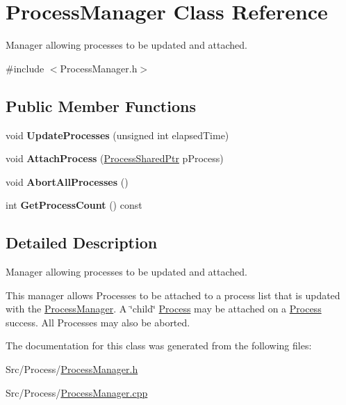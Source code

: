 \hypertarget{classProcessManager}{\section{Process\-Manager Class Reference}
\label{classProcessManager}
}


Manager allowing processes to be updated and attached.  




{\ttfamily \#include $<$Process\-Manager.\-h$>$}

\subsection*{Public Member Functions}
\begin{DoxyCompactItemize}
\item 
\hypertarget{classProcessManager_a962a29955eb8aeef8c3303101126072c}{void {\bfseries Update\-Processes} (unsigned int elapsed\-Time)}\label{classProcessManager_a962a29955eb8aeef8c3303101126072c}

\item 
\hypertarget{classProcessManager_a2c1fc51c9388380c5adfbf222e75fd26}{void {\bfseries Attach\-Process} (\hyperlink{Process_8h_af04951552f62d8a3c69cca91c23500cc}{Process\-Shared\-Ptr} p\-Process)}\label{classProcessManager_a2c1fc51c9388380c5adfbf222e75fd26}

\item 
\hypertarget{classProcessManager_a09099f1d8e10f043baa251cf4a7d3f75}{void {\bfseries Abort\-All\-Processes} ()}\label{classProcessManager_a09099f1d8e10f043baa251cf4a7d3f75}

\item 
\hypertarget{classProcessManager_a04b80a05a8276cc9ee6dad2067c74a11}{int {\bfseries Get\-Process\-Count} () const }\label{classProcessManager_a04b80a05a8276cc9ee6dad2067c74a11}

\end{DoxyCompactItemize}


\subsection{Detailed Description}
Manager allowing processes to be updated and attached. 

This manager allows Processes to be attached to a process list that is updated with the \hyperlink{classProcessManager}{Process\-Manager}. A \char`\"{}child\char`\"{} \hyperlink{classProcess}{Process} may be attached on a \hyperlink{classProcess}{Process} success. All Processes may also be aborted. 

The documentation for this class was generated from the following files\-:\begin{DoxyCompactItemize}
\item 
Src/\-Process/\hyperlink{ProcessManager_8h}{Process\-Manager.\-h}\item 
Src/\-Process/\hyperlink{ProcessManager_8cpp}{Process\-Manager.\-cpp}\end{DoxyCompactItemize}
